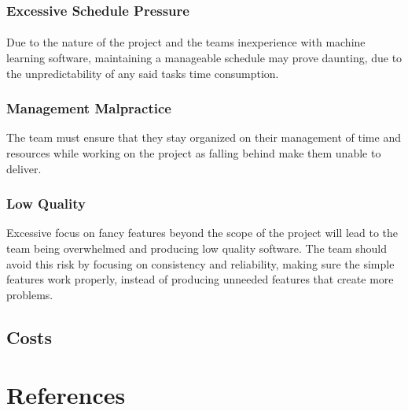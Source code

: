 \documentclass[12pt, titlepage]{article}
\begin{document}
\subsubsection{Excessive Schedule Pressure}
\paragraph{} Due to the nature of the project and the teams inexperience with machine learning software, maintaining a manageable schedule may prove daunting, due to the unpredictability of any said tasks time consumption.

\subsubsection{Management Malpractice}
The team must ensure that they stay organized on their management of time and resources while working on the project as falling behind make them unable to deliver.

\subsubsection{Low Quality}
Excessive focus on fancy features beyond the scope of the project will lead to the team being overwhelmed and producing low quality software. The team should avoid this risk by focusing on consistency and reliability, making sure the simple features work properly, instead of producing unneeded features that create more problems.


\subsection{Costs}





\newpage

\section{References}
\end{document}
